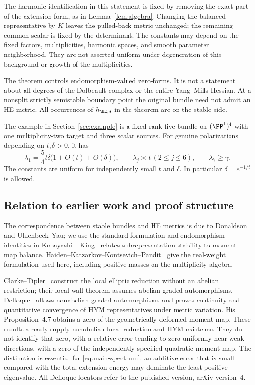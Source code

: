 The harmonic identification in this statement is fixed by removing the
exact part of the extension form, as in Lemma~\ref{lem:algebra}.
Changing the balanced representative by $K$ leaves the pulled-back metric
unchanged; the remaining common scalar is fixed by the determinant.
The constants may depend on the fixed factors, multiplicities, harmonic
spaces, and smooth parameter neighborhood. They are not asserted uniform
under degeneration of this background or growth of the multiplicities.

The theorem controls endomorphism-valued zero-forms. It is not a statement
about all degrees of the Dolbeault complex or the entire Yang--Mills
Hessian. At a nonsplit strictly semistable boundary point the original
bundle need not admit an HE metric. All occurrences of $h_{\HE,s}$ in
the theorem are on the stable side.

The example in Section~\ref{sec:example} is a fixed rank-five bundle on
$(\PP^1)^4$ with one multiplicity-two target and three scalar sources.
For genuine polarizations depending on $t,\delta>0$, it has
\begin{equation}\label{eq:intro-example}
\lambda_1=\frac54t\delta\bigl(1+O(t)+O(\delta)\bigr),\qquad
\lambda_j\asymp t\ (2\le j\le6),\qquad\lambda_7\ge\gamma.
\end{equation}
The constants are uniform for independently small $t$ and $\delta$.
In particular $\delta=e^{-1/t}$ is allowed.

\subsection{Relation to earlier work and proof structure}
The correspondence between stable bundles and HE metrics is due to
Donaldson and Uhlenbeck--Yau; we use the standard formulation and
endomorphism identities in Kobayashi~\cite{kobayashi1987}.
King~\cite{king1994} relates subrepresentation stability to moment-map
balance. Haiden--Katzarkov--Kontsevich--Pandit~\cite[\S5.1,
Theorem~5.1]{hkkp2023} give the real-weight formulation used here,
including positive masses on the multiplicity algebra.

Clarke--Tipler~\cite[Propositions~3.1--3.2]{clarketipler2024}
construct the local elliptic reduction without an abelian restriction;
their local wall theorem assumes abelian graded automorphisms.
Delloque~\cite[Proposition~4.2 and Theorems~4.8--4.9]{delloque2025}
allows nonabelian graded automorphisms and proves continuity and
quantitative convergence of HYM representatives under metric variation.
His Proposition~4.7 obtains a zero of the geometrically deformed moment
map. These results already supply nonabelian local reduction and HYM
existence. They do not identify that zero, with a relative error tending
to zero uniformly near weak directions, with a zero of the independently
specified quadratic moment map. The distinction is essential for
\eqref{eq:main-spectrum}: an additive error that is small compared with
the total extension energy may dominate the least positive eigenvalue.
All Delloque locators refer to the published version, arXiv version~4.

